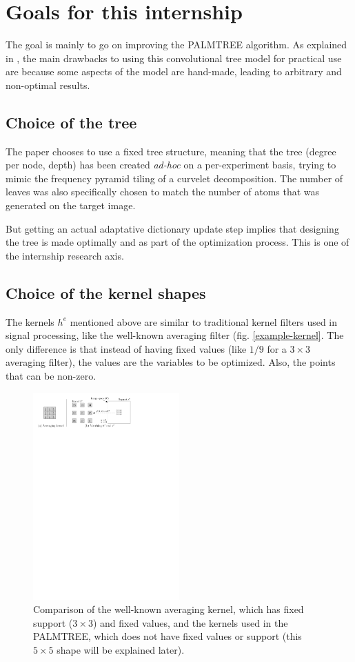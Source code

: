 \section{Goals for this internship}
The goal is mainly to go on improving the PALMTREE algorithm. As explained in \cite[p. 23]{chabiron_optimization_2016}, the main drawbacks to using this convolutional tree model for practical use are because some aspects of the model are hand-made, leading to arbitrary and non-optimal results.
\subsection{Choice of the tree}
The paper chooses to use a fixed tree structure, meaning that the tree (degree per node, depth) has been created \emph{ad-hoc} on a per-experiment basis, trying to mimic the frequency pyramid tiling of a curvelet decomposition. The number of leaves was also specifically chosen to match the number of atoms that was generated on the target image.

But getting an actual adaptative dictionary update step implies that designing the tree is made optimally and as part of the optimization process. This is one of the internship research axis.

\subsection{Choice of the kernel shapes}
The kernels $h^e$ mentioned above are similar to traditional kernel filters used in signal processing, like the well-known averaging filter (fig. \ref{example-kernel}. The only difference is that instead of having fixed values (like $1/9$ for a $3\times3$ averaging filter), the values are the variables to be optimized. Also, the points that can be non-zero.

\begin{figure}
\includegraphics[width=0.5\textwidth]{figures/example-kernel.pdf}
\caption{Comparison of the well-known averaging kernel, which has fixed support ($3\times3$) and fixed values, and the kernels used in the PALMTREE, which does not have fixed values or support (this $5\times5$ shape will be explained later).}
\end{figure}

